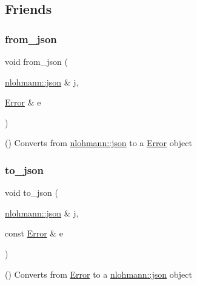 \subsection{Friends}
\mbox{\label{group___de_ga827d73b9e95e7aa59bf1b159251bedf3}} 
\subsubsection{\texorpdfstring{from\+\_\+json}{from\_json}}
{\footnotesize\ttfamily void from\+\_\+json (\begin{DoxyParamCaption}\item[{\hyperlink{namespacenlohmann_a2bfd99e845a2e5cd90aeaf1b1431f474}{nlohmann\+::json} \&}]{j,  }\item[{\hyperlink{classshaan97_1_1sync_1_1_error}{Error} \&}]{e }\end{DoxyParamCaption})\hspace{0.3cm}{\ttfamily [friend]}}

() Converts from {\ttfamily \hyperlink{namespacenlohmann_a2bfd99e845a2e5cd90aeaf1b1431f474}{nlohmann\+::json}} to a {\ttfamily \hyperlink{classshaan97_1_1sync_1_1_error}{Error}} object \mbox{\label{group___de_ga06e5a619d8d673a3bb00b006e62bbe1e}} 
\subsubsection{\texorpdfstring{to\+\_\+json}{to\_json}}
{\footnotesize\ttfamily void to\+\_\+json (\begin{DoxyParamCaption}\item[{\hyperlink{namespacenlohmann_a2bfd99e845a2e5cd90aeaf1b1431f474}{nlohmann\+::json} \&}]{j,  }\item[{const \hyperlink{classshaan97_1_1sync_1_1_error}{Error} \&}]{e }\end{DoxyParamCaption})\hspace{0.3cm}{\ttfamily [friend]}}

() Converts from {\ttfamily \hyperlink{classshaan97_1_1sync_1_1_error}{Error}} to a {\ttfamily \hyperlink{namespacenlohmann_a2bfd99e845a2e5cd90aeaf1b1431f474}{nlohmann\+::json}} object 
